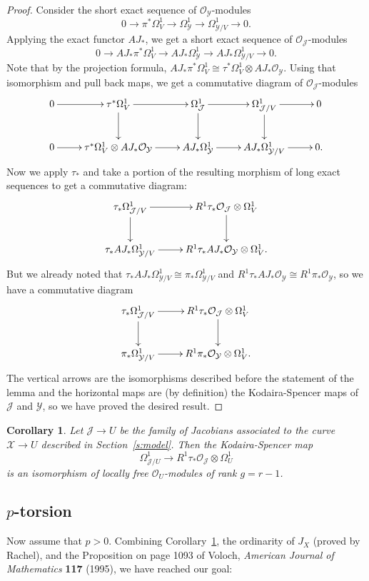 \documentclass[reqno]{amsart}
\newtheorem{cor}[thm]{Corollary}
\theoremstyle{definition}
\theoremstyle{remark}
\def\JJ{\mathcal{J}}
\def\XX{\mathcal{X}}
\def\YY{\mathcal{Y}}
\def\OO{\mathcal{O}}
\def\tensor{\otimes}
\begin{document}
\begin{proof}
Consider the short exact sequence of $\OO_\YY$-modules
$$0\to\pi^*\Omega^1_V\to\Omega^1_\YY\to\Omega^1_{\YY/V}\to0.$$
Applying the exact functor $AJ_*$, we get a short exact sequence of
$\OO_\JJ$-modules
$$0\to AJ_*\pi^*\Omega^1_V\to AJ_*\Omega^1_\YY\to
AJ_*\Omega^1_{\YY/V}\to0.$$
Note that by the projection formula,
$AJ_*\pi^*\Omega^1_V\cong\tau^*\Omega^1_V\tensor AJ_*\OO_\YY$.
Using that isomorphism and pull back maps, we get a commutative
diagram of $\OO_\JJ$-modules
$$\xymatrix{
0\ar[r]&\tau^*\Omega^1_V\ar[r]\ar[d]&
\Omega^1_\JJ\ar[r]\ar[d]&\Omega^1_{\JJ/V}\ar[r]\ar[d]&0\\
0\ar[r]&\tau^*\Omega^1_V\tensor AJ_*\OO_\YY\ar[r]&
AJ_*\Omega^1_\YY\ar[r]&AJ_*\Omega^1_{\YY/V}\ar[r]&0.}$$
Now we apply $\tau_*$ and take a portion of the resulting morphism of
long exact sequences to get a commutative diagram:
$$\xymatrix{
  \tau_*\Omega^1_{\JJ/V}\ar[r]\ar[d]&R^1\tau_*\OO_\JJ\tensor\Omega^1_V\ar[d]\\
  \tau_*AJ_*\Omega^1_{\YY/V}\ar[r]&R^1\tau_*AJ_*\OO_\YY\tensor\Omega^1_V.}$$
But we already noted that
$\tau_*AJ_*\Omega^1_{\YY/V}\cong\pi_*\Omega^1_{\YY/V}$ and
$R^1\tau_*AJ_*\OO_\YY\cong R^1\pi_*\OO_\YY$, so we have a commutative
diagram
$$\xymatrix{
\tau_*\Omega^1_{\JJ/V}\ar[r]\ar[d]&R^1\tau_*\OO_\JJ\tensor\Omega^1_V\ar[d]\\
\pi_*\Omega^1_{\YY/V}\ar[r]&R^1\pi_*\OO_\YY\tensor\Omega^1_V.}$$
The vertical arrows are the isomorphisms described before the
statement of the lemma and the horizontal maps are (by definition) the
Kodaira-Spencer maps of $\JJ$ and $\YY$, so we have proved the desired result.
\end{proof}


\begin{cor}\label{cor:KS-JJ}
Let $\JJ\to U$ be the family of Jacobians associated to the curve
$\XX\to U$ described in Section~\ref{s:model}.  Then the
Kodaira-Spencer map
$$\Omega^1_{\JJ/U}\to R^1\tau_*\OO_\JJ\tensor\Omega^1_U$$ 
is an isomorphism of locally free $\OO_U$-modules of rank $g=r-1$.
\end{cor}


\subsection{$p$-torsion}
Now assume that $p>0$. Combining Corollary~\ref{cor:KS-JJ}, the
ordinarity of $J_X$ (proved by Rachel), and the Proposition on page
1093 of Voloch, {\it American Journal of Mathematics\/} {\bf 117}
(1995), we have reached our goal:
\end{document}
